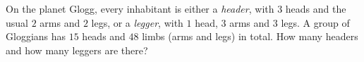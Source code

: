 On the planet Glogg, every inhabitant is either a \emph{header}, with $3$ heads and the usual $2$ arms and $2$ legs, or a \emph{legger}, with $1$ head, $3$ arms and $3$ legs. A group of Gloggians has $15$ heads and $48$ limbs (arms and legs) in total. How many headers and how many leggers are there?

